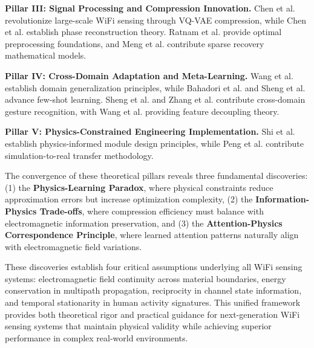 \documentclass[journal]{IEEEtran}
\begin{document}
{\textbf{Pillar III: Signal Processing and Compression Innovation.} Chen et al. \cite{chen2024efficientfi} revolutionize large-scale WiFi sensing through VQ-VAE compression, while Chen et al. \cite{chen2024wiphase} establish phase reconstruction theory. Ratnam et al. \cite{ratnam2024optimal} provide optimal preprocessing foundations, and Meng et al. \cite{meng2021wihgr} contribute sparse recovery mathematical models.

\textbf{Pillar IV: Cross-Domain Adaptation and Meta-Learning.} Wang et al. \cite{wang2022airfi} establish domain generalization principles, while Bahadori et al. \cite{bahadori2022rewis} and Sheng et al. \cite{sheng2024metaformer} advance few-shot learning. Sheng et al. \cite{sheng2024cdfi} and Zhang et al. \cite{zhang2021wifi} contribute cross-domain gesture recognition, with Wang et al. \cite{wang2024feature} providing feature decoupling theory.

\textbf{Pillar V: Physics-Constrained Engineering Implementation.} Shi et al. \cite{shi2023simplified} establish physics-informed module design principles, while Peng et al. \cite{peng2018sim} contribute simulation-to-real transfer methodology.

The convergence of these theoretical pillars reveals three fundamental discoveries: (1) the \textbf{Physics-Learning Paradox}, where physical constraints reduce approximation errors but increase optimization complexity, (2) the \textbf{Information-Physics Trade-offs}, where compression efficiency must balance with electromagnetic information preservation, and (3) the \textbf{Attention-Physics Correspondence Principle}, where learned attention patterns naturally align with electromagnetic field variations.

These discoveries establish four critical assumptions underlying all WiFi sensing systems: electromagnetic field continuity across material boundaries, energy conservation in multipath propagation, reciprocity in channel state information, and temporal stationarity in human activity signatures. This unified framework provides both theoretical rigor and practical guidance for next-generation WiFi sensing systems that maintain physical validity while achieving superior performance in complex real-world environments.

}
\end{document}

